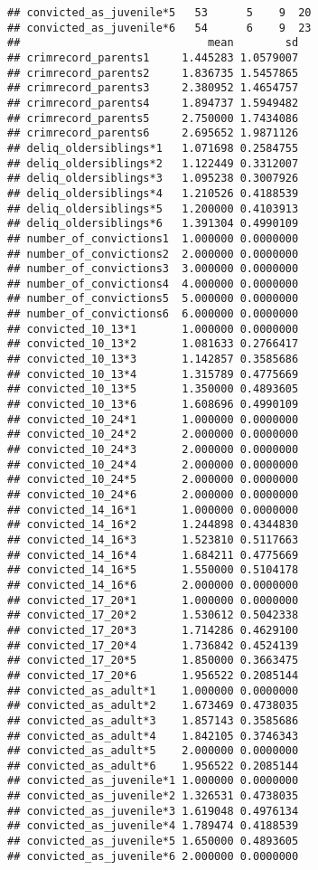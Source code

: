 \documentclass[]{tufte-handout}
\begin{document}
\begin{verbatim}
## convicted_as_juvenile*5   53      5    9  20
## convicted_as_juvenile*6   54      6    9  23
##                             mean        sd
## crimrecord_parents1     1.445283 1.0579007
## crimrecord_parents2     1.836735 1.5457865
## crimrecord_parents3     2.380952 1.4654757
## crimrecord_parents4     1.894737 1.5949482
## crimrecord_parents5     2.750000 1.7434086
## crimrecord_parents6     2.695652 1.9871126
## deliq_oldersiblings*1   1.071698 0.2584755
## deliq_oldersiblings*2   1.122449 0.3312007
## deliq_oldersiblings*3   1.095238 0.3007926
## deliq_oldersiblings*4   1.210526 0.4188539
## deliq_oldersiblings*5   1.200000 0.4103913
## deliq_oldersiblings*6   1.391304 0.4990109
## number_of_convictions1  1.000000 0.0000000
## number_of_convictions2  2.000000 0.0000000
## number_of_convictions3  3.000000 0.0000000
## number_of_convictions4  4.000000 0.0000000
## number_of_convictions5  5.000000 0.0000000
## number_of_convictions6  6.000000 0.0000000
## convicted_10_13*1       1.000000 0.0000000
## convicted_10_13*2       1.081633 0.2766417
## convicted_10_13*3       1.142857 0.3585686
## convicted_10_13*4       1.315789 0.4775669
## convicted_10_13*5       1.350000 0.4893605
## convicted_10_13*6       1.608696 0.4990109
## convicted_10_24*1       1.000000 0.0000000
## convicted_10_24*2       2.000000 0.0000000
## convicted_10_24*3       2.000000 0.0000000
## convicted_10_24*4       2.000000 0.0000000
## convicted_10_24*5       2.000000 0.0000000
## convicted_10_24*6       2.000000 0.0000000
## convicted_14_16*1       1.000000 0.0000000
## convicted_14_16*2       1.244898 0.4344830
## convicted_14_16*3       1.523810 0.5117663
## convicted_14_16*4       1.684211 0.4775669
## convicted_14_16*5       1.550000 0.5104178
## convicted_14_16*6       2.000000 0.0000000
## convicted_17_20*1       1.000000 0.0000000
## convicted_17_20*2       1.530612 0.5042338
## convicted_17_20*3       1.714286 0.4629100
## convicted_17_20*4       1.736842 0.4524139
## convicted_17_20*5       1.850000 0.3663475
## convicted_17_20*6       1.956522 0.2085144
## convicted_as_adult*1    1.000000 0.0000000
## convicted_as_adult*2    1.673469 0.4738035
## convicted_as_adult*3    1.857143 0.3585686
## convicted_as_adult*4    1.842105 0.3746343
## convicted_as_adult*5    2.000000 0.0000000
## convicted_as_adult*6    1.956522 0.2085144
## convicted_as_juvenile*1 1.000000 0.0000000
## convicted_as_juvenile*2 1.326531 0.4738035
## convicted_as_juvenile*3 1.619048 0.4976134
## convicted_as_juvenile*4 1.789474 0.4188539
## convicted_as_juvenile*5 1.650000 0.4893605
## convicted_as_juvenile*6 2.000000 0.0000000

\end{verbatim}
\end{document}
